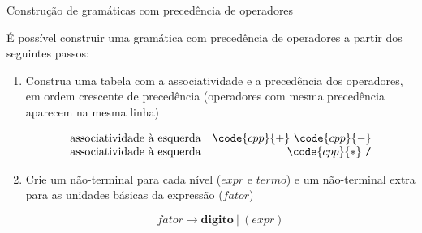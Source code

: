 \begin{frame}[fragile]{Construção de gramáticas com precedência de operadores}

    É possível construir uma gramática com precedência de operadores a partir dos seguintes passos:

    \vspace{0.2in}

    \begin{enumerate}
        \item Construa uma tabela com a associatividade e a precedência dos operadores, em ordem crescente de precedência (operadores com mesma precedência 
            aparecem na mesma linha)
        \begin{footnotesize}
        \[
            \begin{array}{lr}
                \mbox{associatividade à esquerda} & \code{cpp}{+}\ \code{cpp}{-} \\
                \mbox{associatividade à esquerda} & \code{cpp}{*}\ \texttt{/} \\
            \end{array}
        \]
        \end{footnotesize}
       
        \item Crie um não-terminal para cada nível ($expr$ e $termo$) e um não-terminal extra para as unidades básicas da expressão ($fator$)
        \begin{footnotesize}
        \[
            fator \to \mathbf{digito}\ |\ (expr)
        \]
        \end{footnotesize}
 
    \end{enumerate}

\end{frame}

